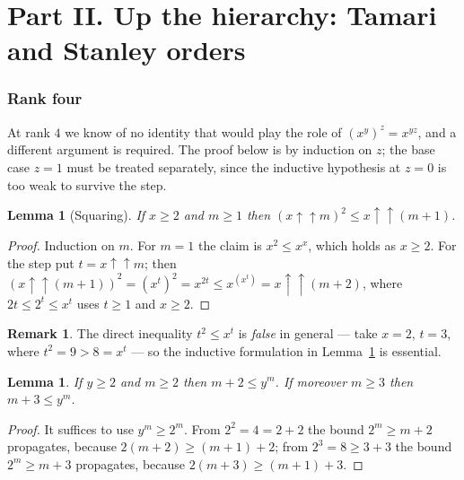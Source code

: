 \documentclass[11pt,a4paper]{article}
\theoremstyle{plain}
\newtheorem{lemma}[theorem]{Lemma}
\theoremstyle{definition}
\newtheorem{remark}[theorem]{Remark}
\newcommand{\tw}{\uparrow\uparrow}
\begin{document}
\part*{Part II. Up the hierarchy: Tamari and Stanley orders}
\section{Rank four}\label{sec:rank4}

At rank $4$ we know of no identity that would play the role of $(x^{y})^{z}=x^{yz}$,
and a different argument is required.
The proof below is by induction on $z$; the base case $z=1$ must be treated
separately, since the inductive hypothesis at $z=0$ is too weak to survive the step.

\begin{lemma}[Squaring]\label{lem:sq}
If $x\ge2$ and $m\ge1$ then $(x\tw m)^{2}\le x\tw(m+1)$.
\end{lemma}

\begin{proof}
Induction on $m$. For $m=1$ the claim is $x^{2}\le x^{x}$, which holds as $x\ge2$.
For the step put $t=x\tw m$; then
$(x\tw(m+1))^{2}=(x^{t})^{2}=x^{2t}\le x^{(x^{t})}=x\tw(m+2)$,
where $2t\le 2^{t}\le x^{t}$ uses $t\ge1$ and $x\ge2$.
\end{proof}

\begin{remark}\label{rem:sq}
The direct inequality $t^{2}\le x^{t}$ is \emph{false} in general --- take $x=2$,
$t=3$, where $t^{2}=9>8=x^{t}$ --- so the inductive formulation in Lemma~\ref{lem:sq}
is essential.
\end{remark}

\begin{lemma}\label{lem:add-two}
If $y\ge2$ and $m\ge2$ then $m+2\le y^{m}$. If moreover $m\ge3$ then $m+3\le y^{m}$.
\end{lemma}

\begin{proof}
It suffices to use $y^{m}\ge2^{m}$. From $2^{2}=4=2+2$ the bound $2^{m}\ge m+2$
propagates, because $2(m+2)\ge(m+1)+2$; from $2^{3}=8\ge3+3$ the bound
$2^{m}\ge m+3$ propagates, because $2(m+3)\ge(m+1)+3$.
\end{proof}
\end{document}
